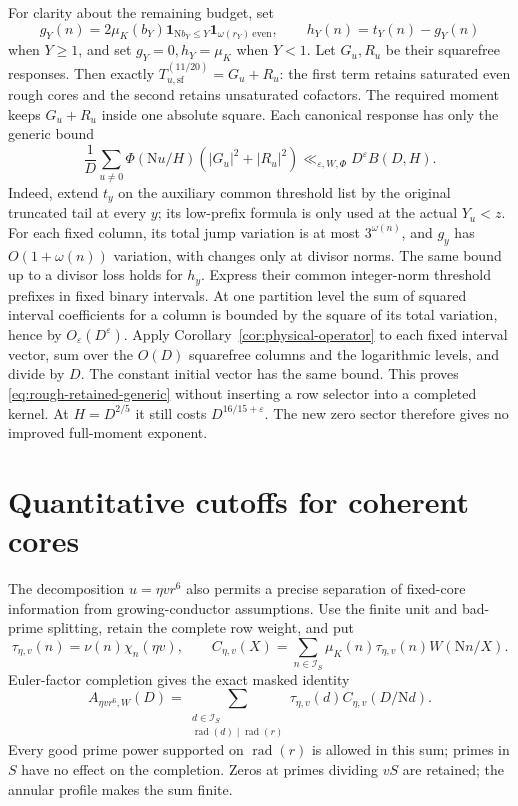 \documentclass[11pt]{article}
\numberwithin{equation}{section}
\theoremstyle{definition}
\theoremstyle{remark}
\newcommand{\N}{\mathrm N}
\newcommand{\muK}{\mu_K}
\newcommand{\ind}{\mathbf 1}
\newcommand{\eps}{\varepsilon}
\newcommand{\good}{\mathcal I_S}
\begin{document}
For clarity about the remaining budget, set
\[
 g_Y(n)=2\muK(b_Y)\ind_{\N b_Y\le Y}
                  \ind_{\omega(r_Y)\ \mathrm{even}},\qquad
 h_Y(n)=t_Y(n)-g_Y(n)
\]
when \(Y\ge1\), and set \(g_Y=0,h_Y=\muK\) when \(Y<1\).
Let \(G_u,R_u\) be their squarefree responses. Then exactly
\(T_{u,\mathrm{sf}}^{(11/20)}=G_u+R_u\): the first term retains
saturated even rough cores and the second retains unsaturated cofactors.
The required moment keeps \(G_u+R_u\) inside one absolute square.
Each canonical response has only the generic bound
\begin{equation}\label{eq:rough-retained-generic}
 \frac1D\sum_{u\ne0}\Phi(\N u/H)(|G_u|^2+|R_u|^2)
       \ll_{\eps,W,\Phi}D^\eps B(D,H).
\end{equation}
Indeed, extend \(t_y\) on the auxiliary common threshold list by the
original truncated tail at every \(y\); its low-prefix formula is only
used at the actual \(Y_u<z\). For each fixed column, its total jump variation is at
most \(3^{\omega(n)}\), and \(g_y\) has \(O(1+\omega(n))\)
variation, with changes only at divisor norms. The same bound up to
a divisor loss holds for \(h_y\). Express their common integer-norm
threshold prefixes in fixed binary intervals. At one partition level
the sum of squared interval coefficients for a column is bounded by
the square of its total variation, hence by \(O_\eps(D^\eps)\).
Apply Corollary~\ref{cor:physical-operator} to each fixed interval
vector, sum over the \(O(D)\) squarefree columns and the logarithmic
levels, and divide by \(D\). The constant initial vector has the same
bound. This proves \eqref{eq:rough-retained-generic} without inserting
a row selector into a completed kernel.
At \(H=D^{2/5}\) it still costs \(D^{16/15+\eps}\).
The new zero sector therefore gives no improved full-moment exponent.

\section{Quantitative cutoffs for coherent cores}
\label{sfac:subsec:cores}

The decomposition $u=\eta vr^6$ also permits a precise separation of
fixed-core information from growing-conductor assumptions.  Use the
finite unit and bad-prime splitting, retain the complete row weight,
and put
\[
 \tau_{\eta,v}(n)=\nu(n)\chi_n(\eta v),\qquad
 C_{\eta,v}(X)=\sum_{n\in\good}
      \mu_K(n)\tau_{\eta,v}(n)W(\N n/X).
\]
Euler-factor completion gives the exact masked identity
\begin{equation}
 A_{\eta vr^6,W}(D)=
   \sum_{\substack{d\in\good\\
                  \operatorname{rad}(d)\mid\operatorname{rad}(r)}}
       \tau_{\eta,v}(d)C_{\eta,v}(D/\N d).
 \label{sfac:eq:core-completion}
\end{equation}
Every good prime power supported on $\operatorname{rad}(r)$ is allowed
in this sum; primes in $S$ have no effect on the completion.  Zeros at primes dividing $vS$ are retained; the annular
profile makes the sum finite.
\end{document}
